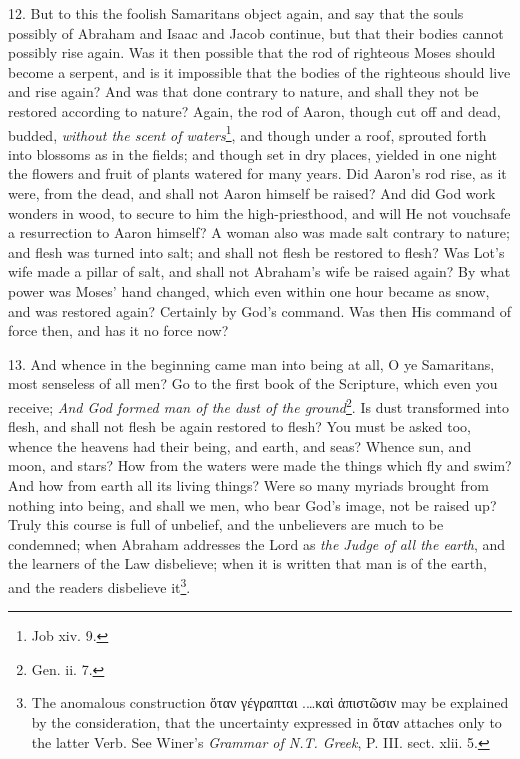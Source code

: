 12. But to this the foolish Samaritans object again, and say that the souls possibly of Abraham and Isaac and Jacob continue, but that their bodies cannot possibly rise again. Was it then possible that the rod of righteous Moses should become a serpent, and is it impossible that the bodies of the righteous should live and rise again? And was that done contrary to nature, and shall they not be restored according to nature? Again, the rod of Aaron, though cut off and dead, budded, \emph{without the scent of waters}\footnote{Job xiv. 9.}, and though under a roof, sprouted forth into blossoms as in the fields; and though set in dry places, yielded in one night the flowers and fruit of plants watered for many years. Did Aaron’s rod rise, as it were, from the dead, and shall not Aaron himself be raised? And did God work wonders in wood, to secure to him the high-priesthood, and will He not vouchsafe a resurrection to Aaron himself? A woman also was made salt contrary to nature; and flesh was turned into salt; and shall not flesh be restored to flesh? Was Lot’s wife made a pillar of salt, and shall not Abraham’s wife be raised again? By what power was Moses’ hand changed, which even within one hour became as snow, and was restored again? Certainly by God’s command. Was then His command of force then, and has it no force now?

13. And whence in the beginning came man into being at all, O ye Samaritans, most senseless of all men? Go to the first book of the Scripture, which even you receive; \emph{And God formed man of the dust of the ground}\footnote{Gen. ii. 7.}. Is dust transformed into flesh, and shall not flesh be again restored to flesh? You must be asked too, whence the heavens had their being, and earth, and seas? Whence sun, and moon, and stars? How from the waters were made the things which fly and swim? And how from earth all its living things? Were so many myriads brought from nothing into being, and shall we men, who bear God’s image, not be raised up? Truly this course is full of unbelief, and the unbelievers are much to be condemned; when Abraham addresses the Lord as \emph{the Judge of all the earth}, and the learners of the Law disbelieve; when it is written that man is of the earth, and the readers disbelieve it\footnote{The anomalous construction \textgreek{ὅταν γέγραπται .…καὶ ἀπιστῶσιν} may be explained by the consideration, that the uncertainty expressed in \textgreek{ὅταν} attaches only to the latter Verb. See Winer’s \emph{Grammar of N.T. Greek}, P. III. sect. xlii. 5.}.

